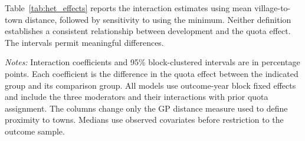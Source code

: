 Table~\ref{tab:het_effects} reports the interaction estimates using mean village-to-town distance, followed by sensitivity to using the minimum. Neither definition establishes a consistent relationship between development and the quota effect. The intervals permit meaningful differences.

\begin{table}[!htbp]
\centering
\caption{Development and Quota Effects: Primary Estimates and Distance Sensitivity}
\label{tab:het_effects}
\small
\setlength{\tabcolsep}{3pt}

\begin{minipage}{\textwidth}\footnotesize
\emph{Notes:} Interaction coefficients and 95\% block-clustered intervals are in percentage points. Each coefficient is the difference in the quota effect between the indicated group and its comparison group. All models use outcome-year block fixed effects and include the three moderators and their interactions with prior quota assignment. The columns change only the GP distance measure used to define proximity to towns. Medians use observed covariates before restriction to the outcome sample.
\end{minipage}
\end{table}
\FloatBarrier
